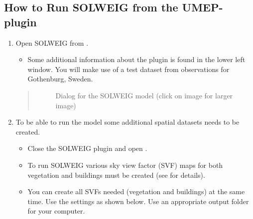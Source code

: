 \documentclass[letterpaper,10pt,english]{sphinxmanual}
\let\sphinxpxdimen\pdfpxdimen\else\newdimen\sphinxpxdimen
\begin{document}
\subsection{How to Run SOLWEIG from the UMEP-plugin}
\label{\detokenize{Tutorials/IntroductionToSolweig:how-to-run-solweig-from-the-umep-plugin}}\begin{enumerate}
\item {} 
Open SOLWEIG from .
\begin{itemize}
\item {} 
Some additional information about the plugin is found in the lower
left window. You will make use of a test dataset from observations
for Gothenburg, Sweden.

\end{itemize}
\begin{quote}

\begin{figure}[htbp]
\centering
\capstart

\noindent\sphinxincludegraphics[width=1070\sphinxpxdimen]{{SOLWEIG_Interface}.png}
\caption{Dialog for the SOLWEIG model (click on image for larger image)}\label{\detokenize{Tutorials/IntroductionToSolweig:id3}}\end{figure}
\end{quote}

\item {} 
To be able to run the model some additional spatial datasets needs to
be created.
\begin{itemize}
\item {} 
Close the SOLWEIG plugin and open .

\item {} 
To run SOLWEIG various sky view factor (SVF) maps for both
vegetation and buildings must be created (see 
for details).

\item {} 
You can create all SVFs needed (vegetation and buildings) at the
same time. Use the settings as shown below. Use an appropriate
output folder for your computer.

\end{itemize}
\begin{quote}


\end{quote}
\end{enumerate}
\end{document}
